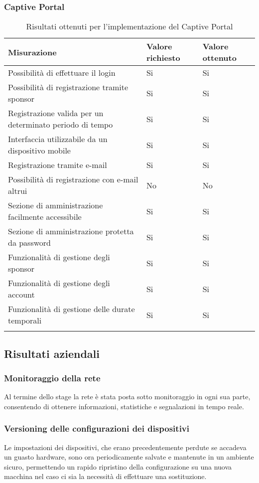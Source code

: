 \documentclass[Tesi.tex]{subfiles}
\begin{document}
\newpage
\subsubsection{Captive Portal}
\label{table:Risultati ottenuti per l'implementazione del Captive Portal}
\renewcommand*{\arraystretch}{1.2}
\begin{longtable}[H]{p{9.5cm}p{3.2cm}p{2cm}}
	\rowcolor{CHeader}
	\color{CHeaderText} \textbf{Misurazione} & \color{CHeaderText} \textbf{Valore richiesto}& \color{CHeaderText} \textbf{Valore ottenuto}  \\
	\endhead
	Possibilità di effettuare il login &
	Si & Si \\
	Possibilità di registrazione tramite sponsor &
	Si & Si \\
	Registrazione valida per un determinato periodo di tempo &
	Si & Si \\
	Interfaccia utilizzabile da un dispositivo mobile &
	Si & Si \\
	Registrazione tramite e-mail &
	Si & Si \\
	Possibilità di registrazione con e-mail altrui &
	No & No \\
	Sezione di amministrazione facilmente accessibile &
	Si & Si \\
	Sezione di amministrazione protetta da password &
	Si & Si \\
	Funzionalità di gestione degli sponsor &
	Si & Si \\
	Funzionalità di gestione degli account &
	Si & Si \\
	Funzionalità di gestione delle durate temporali &
	Si & Si \\
	
	\hiderowcolors
	\caption{Risultati ottenuti per l'implementazione del Captive Portal}
\end{longtable}

\newpage
\subsection{Risultati aziendali}
\subsubsection{Monitoraggio della rete}
Al termine dello stage la rete è stata posta sotto monitoraggio in ogni sua parte, consentendo di ottenere informazioni, statistiche e segnalazioni in tempo reale.

\subsubsection{Versioning delle configurazioni dei dispositivi}
Le impostazioni dei dispositivi, che erano precedentemente perdute se accadeva un guasto hardware, sono ora periodicamente salvate e mantenute in un ambiente sicuro, permettendo un rapido ripristino della configurazione su una nuova macchina nel caso ci sia la necessità di effettuare una sostituzione.
\end{document}
